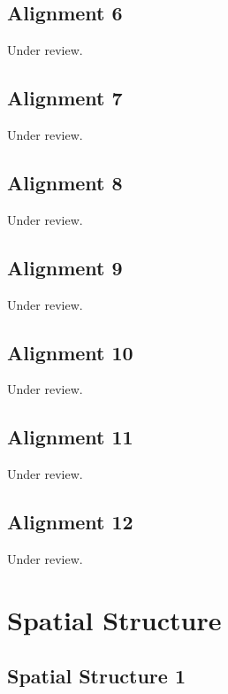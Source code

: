 \documentclass{scrartcl}
\begin{document}
\subsection{Alignment 6}
\label{sec:align_6}
Under review.%
\clearpage

\subsection{Alignment 7}
\label{sec:align_7}
Under review.%
\clearpage

\subsection{Alignment 8}
\label{sec:align_8}
Under review.%
\clearpage

\subsection{Alignment 9}
\label{sec:align_9}
Under review.%
\clearpage

\subsection{Alignment 10}
\label{sec:align_10}
Under review.%
\clearpage

\subsection{Alignment 11}
\label{sec:align_11}
Under review.%
\clearpage

\subsection{Alignment 12}
\label{sec:align_12}
Under review.%
\clearpage

\section{Spatial Structure}

\subsection{Spatial Structure 1}
\label{sec:spatial_1}
\clearpage
\end{document}
